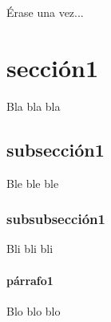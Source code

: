 Érase una vez...
\section{sección1}
Bla bla bla
\subsection{subsección1}
Ble ble ble
\subsubsection{subsubsección1}
Bli bli bli
\paragraph{párrafo1}
Blo blo blo